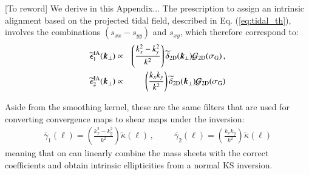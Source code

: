 \documentclass[useAMS,usenatbib]{mn2e}
\newcommand{\JHD}[1]{\textcolor{mypink1}{#1}}
\begin{document}
\JHD{[To reword]} We derive in this Appendix...  
The prescription to assign an intrinsic alignment based on the projected tidal field, described in Eq. (\ref{eq:tidal_th}), involves the combinations $(s_{xx} - s_{yy})$ and $s_{xy}$, which therefore correspond to:
\begin{eqnarray}
 \widetilde{\epsilon}_1^{\rm IA} (\boldsymbol k_{\perp})  &\propto& \left(\frac{k_x^2 - k_y^2}{k^2} \right) \widetilde{\delta}_{\rm 2D}(\boldsymbol k_{\perp})\mathcal{G_{\rm 2D}}(\sigma_{\rm G})  \, ,\nonumber \\
 \widetilde{\epsilon}_2^{\rm IA} (\boldsymbol k_\perp)  &\propto& \left(\frac{k_x k_y}{k^2} \right) \widetilde {\delta}_{\rm 2D}(\boldsymbol k_\perp)\mathcal{G_{\rm 2D}}(\sigma_{\rm G}) 
\end{eqnarray}

Aside from the smoothing kernel, these are the same filters that are used for converting convergence maps to shear maps under the \citet[][KS hereafter]{KaiserSquires} inversion:
 \begin{eqnarray}
 \widetilde{\gamma_1} (\boldsymbol \ell)  = \left(\frac{k_x^2 - k_y^2}{k^2} \right) \widetilde {\kappa}(\boldsymbol \ell) \, , \hspace{1cm} \widetilde{\gamma_2} (\boldsymbol \ell)  = \left(\frac{k_x k_y}{k^2} \right) \widetilde {\kappa}(\boldsymbol \ell)
\end{eqnarray}
meaning that on can linearly combine the mass sheets with the correct coefficients and obtain intrinsic ellipticities from a normal KS inversion. 
\end{document}
